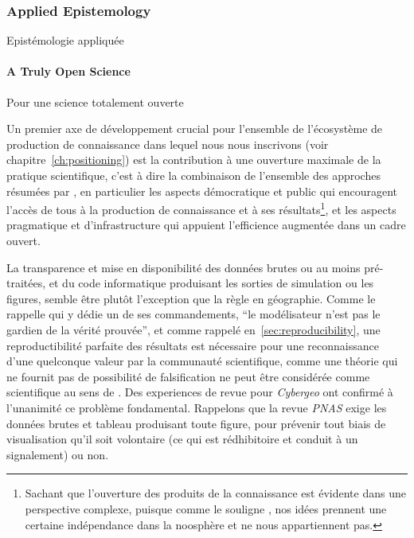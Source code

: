 \subsubsection*{Applied Epistemology}{Epistémologie appliquée}


\paragraph{A Truly Open Science}{Pour une science totalement ouverte}

Un premier axe de développement crucial pour l'ensemble de l'écosystème de production de connaissance dans lequel nous nous inscrivons (voir chapitre~\ref{ch:positioning}) est la contribution à une ouverture maximale de la pratique scientifique, c'est à dire la combinaison de l'ensemble des approches résumées par \cite{fecher2014open}, en particulier les aspects démocratique et public qui encouragent l'accès de tous à la production de connaissance et à ses résultats\footnote{Sachant que l'ouverture des produits de la connaissance est évidente dans une perspective complexe, puisque comme le souligne \cite{morin1991methode}, nos idées prennent une certaine indépendance dans la noosphère et ne nous appartiennent pas.}, et les aspects pragmatique et d'infrastructure qui appuient l'efficience augmentée dans un cadre ouvert.

La transparence et mise en disponibilité des données brutes ou au moins pré-traitées, et du code informatique produisant les sorties de simulation ou les figures, semble être plutôt l'exception que la règle en géographie. Comme le rappelle \cite{banos2013pour} qui y dédie un de ses commandements, ``le modélisateur n'est pas le gardien de la vérité prouvée'', et comme rappelé en~\ref{sec:reproducibility}, une reproductibilité parfaite des résultats est nécessaire pour une reconnaissance d'une quelconque valeur par la communauté scientifique, comme une théorie qui ne fournit pas de possibilité de falsification ne peut être considérée comme scientifique au sens de . Des experiences de revue pour \emph{Cybergeo} ont confirmé à l'unanimité ce problème fondamental. Rappelons que la revue \emph{PNAS} exige les données brutes et tableau produisant toute figure, pour prévenir tout biais de visualisation qu'il soit volontaire (ce qui est rédhibitoire et conduit à un signalement) ou non.

